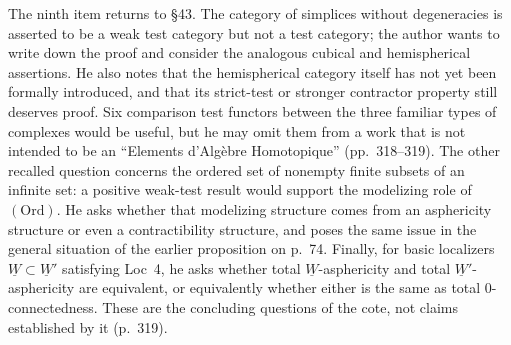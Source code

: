 The ninth item returns to \S43. The category of simplices without degeneracies is asserted to be a weak test category but not a test category; the author wants to write down the proof and consider the analogous cubical and hemispherical assertions. He also notes that the hemispherical category itself has not yet been formally introduced, and that its strict-test or stronger contractor property still deserves proof. Six comparison test functors between the three familiar types of complexes would be useful, but he may omit them from a work that is not intended to be an “Elements d'Algèbre Homotopique” (pp.\ 318--319). The other recalled question concerns the ordered set of nonempty finite subsets of an infinite set: a positive weak-test result would support the modelizing role of $(\mathrm{Ord})$. He asks whether that modelizing structure comes from an asphericity structure or even a contractibility structure, and poses the same issue in the general situation of the earlier proposition on p.\ 74. Finally, for basic localizers $\underline W\subset\underline W'$ satisfying Loc~4, he asks whether total $\underline W$-asphericity and total $\underline W'$-asphericity are equivalent, or equivalently whether either is the same as total 0-connectedness. These are the concluding questions of the cote, not claims established by it (p.\ 319).

